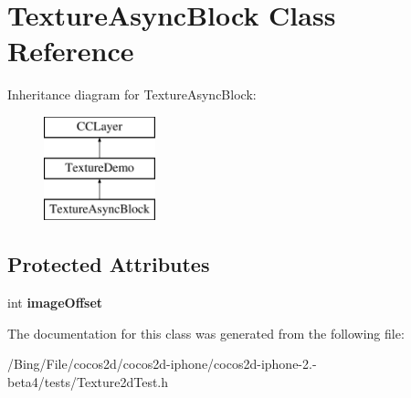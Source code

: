 \hypertarget{interface_texture_async_block}{\section{Texture\-Async\-Block Class Reference}
\label{interface_texture_async_block}
}
Inheritance diagram for Texture\-Async\-Block\-:\begin{figure}[H]
\begin{center}
\leavevmode
\includegraphics[height=3.000000cm]{interface_texture_async_block}
\end{center}
\end{figure}
\subsection*{Protected Attributes}
\begin{DoxyCompactItemize}
\item 
\hypertarget{interface_texture_async_block_a4455bed6347be8779e22e496a746bbd0}{int {\bfseries image\-Offset}}\label{interface_texture_async_block_a4455bed6347be8779e22e496a746bbd0}

\end{DoxyCompactItemize}


The documentation for this class was generated from the following file\-:\begin{DoxyCompactItemize}
\item 
/\-Bing/\-File/cocos2d/cocos2d-\/iphone/cocos2d-\/iphone-\/2.-\/beta4/tests/Texture2d\-Test.\-h\end{DoxyCompactItemize}
